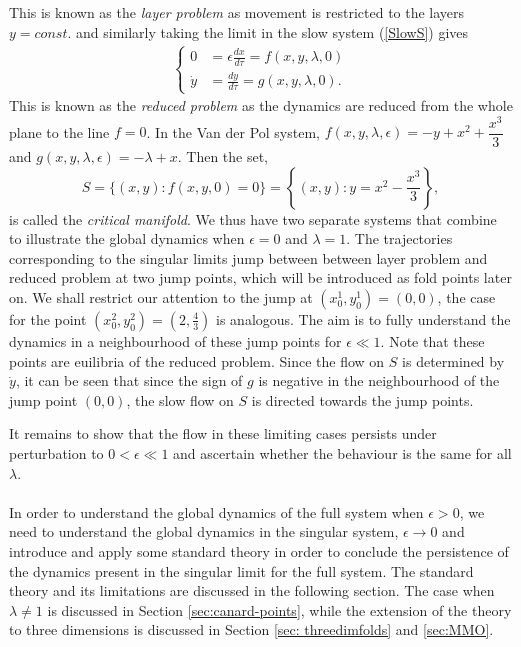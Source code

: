 This is known as the \emph{layer problem} as movement is restricted to the layers $y=const.$ and similarly taking the limit in the slow system (\ref{SlowS}) gives
	\begin{align}\label{SlowS0}
		\begin{cases}
			0 &= \epsilon \frac{dx}{d \tau} = f(x,y,\lambda, 0)\\
			\dot{y} & = \frac{dy}{d \tau} =  g( x,y, \lambda,0).
		\end{cases}
	\end{align}
This is known as the \emph{reduced problem} as the dynamics are reduced from the whole plane to the line $f=0$. In the Van der Pol system, $f(x,y,\lambda,\epsilon)=-y+x^2+\dfrac{x^3}{3}$ and $g(x,y,\lambda,\epsilon)=-\lambda+x$. Then the set,
\begin{equation}
 S= \{ (x,y) : f(x,y,0)=0 \} = \left\{ (x,y) : y = x^2-\dfrac{x^3}{3}\right \},\label{CriticalS}
\end{equation} 
is called the \emph{critical manifold}. We thus have two separate systems that combine to illustrate the global dynamics when $\epsilon =0$ and $\lambda = 1$. 
The trajectories corresponding to the singular limits jump between between layer problem and reduced problem at two jump points, which will be introduced as fold points later on.
We shall restrict our attention to the jump at $ (x^1_0,y^1_0)=(0,0)$, the case for the point $(x^2_0,y^2_0)=(2,\frac{4}{3})$ is analogous. The aim is to fully understand the dynamics in a neighbourhood of these jump points for $\epsilon \ll 1$. Note that these points are euilibria of the reduced problem.
Since the flow on $S$ is determined by $\dot{y}$, it can be seen that since the sign of $g$ is negative in the neighbourhood of the jump point $(0,0)$, the slow flow on $S$ is directed towards the jump points.

It remains to show that the flow in these limiting cases persists under perturbation to $0<\epsilon \ll 1$ and ascertain whether the behaviour is the same for all $\lambda$. 
\\
\\
In order to understand the global dynamics of the full system when $\epsilon >0$, we need to understand the global dynamics in the singular system, $\epsilon \to 0$ and introduce and apply some standard theory in order to conclude the persistence of the dynamics present in the singular limit for the full system.
The standard theory and its limitations are discussed in the following section.
The case when $\lambda \neq 1$ is discussed in Section \ref{sec:canard-points}, while the extension of the theory to three dimensions is discussed in Section \ref{sec: threedimfolds} and \ref{sec:MMO}.

